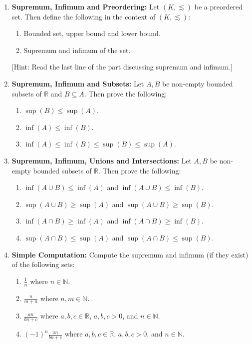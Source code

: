 \begin{enumerate}[label=\textbf{\arabic*.}]
    \item \textbf{Supremum, Infimum and Preordering:} Let $(K,\lesssim)$ be a preordered set. Then define the following in the context of $(K,\lesssim)$:
    \begin{enumerate}
        \item Bounded set, upper bound and lower bound.
        \item Supremum and infimum of the set.
    \end{enumerate}
    [Hint: Read the last line of the part discussing supremum and infimum.]
    \item \textbf{Supremum, Infimum and Subsets:} Let $A,B$ be non-empty bounded subsets of $\mathbb{R}$ and $B\subseteq A$. Then prove the following:
    \begin{enumerate}
        \item $\sup(B)\leq\sup(A)$.
        \item $\inf(A)\leq\inf(B)$.
        \item $\inf(A)\leq\inf(B)\leq\sup(B)\leq\sup(A)$.
    \end{enumerate}
    \item \textbf{Supremum, Infimum, Unions and Intersections:} Let $A,B$ be non-empty bounded subsets of $\mathbb{R}$. Then prove the following:
    \begin{enumerate}
        \item $\inf(A\cup B)\leq\inf(A)$ and $\inf(A\cup B)\leq\inf(B)$.
        \item $\sup(A\cup B)\geq\sup(A)$ and $\sup(A\cup B)\geq\sup(B)$.
        \item $\inf(A\cap B)\geq\inf(A)$ and $\inf(A\cap B)\geq\inf(B)$.
        \item $\sup(A\cap B)\leq\sup(A)$ and $\sup(A\cap B)\leq\sup(B)$.
    \end{enumerate}
    \item \textbf{Simple Computation:} Compute the supremum and infimum (if they exist) of the following sets:
    \begin{enumerate}
        \item $\frac{1}{n}$ where $n\in\mathbb{N}$.
        \item $\frac{n}{m+n}$ where $n,m\in\mathbb{N}$.
        \item $\frac{an}{bn+c}$ where $a,b,c\in\mathbb{R}$, $a, b, c>0$, and $n\in\mathbb{N}$.
        \item $(-1)^n\frac{an}{bn+c}$ where $a,b,c\in\mathbb{R}$, $a, b, c>0$, and $n\in\mathbb{N}$.

\end{enumerate}
\end{enumerate}

